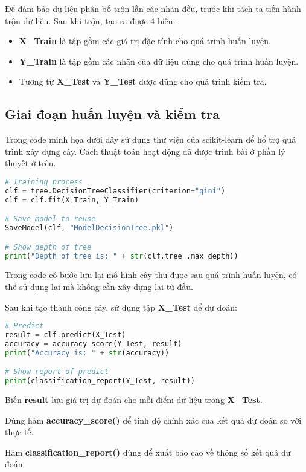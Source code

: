 \documentclass[../main-report.tex]{subfiles}
\begin{document}
Để đảm bảo dữ liệu phân bố trộn lẫn các nhãn đều, trước khi tách ta tiến hành trộn dữ liệu. Sau khi trộn, tạo ra được 4 biến:

\begin{itemize}
\item \textbf{X\_Train} là tập gồm các giá trị đặc tính cho quá trình huấn luyện.
\item \textbf{Y\_Train} là tập gồm các nhãn cũa dữ liệu dùng cho quá trình huấn luyện.
\item Tương tự \textbf{X\_Test} và \textbf{Y\_Test} được dùng cho quá trình kiểm tra.
\end{itemize}

\subsection{Giai đoạn huấn luyện và kiểm tra}
Trong code minh họa dưới đây sử dụng thư viện của scikit-learn để hổ trợ quá trình xây dựng cây. Cách thuật toán hoạt động đã được trình bài ở phần lý thuyết ở trên.

\begin{lstlisting}[language=Python]
# Training process
clf = tree.DecisionTreeClassifier(criterion="gini")
clf = clf.fit(X_Train, Y_Train)

# Save model to reuse
SaveModel(clf, "ModelDecisionTree.pkl")

# Show depth of tree
print("Depth of tree is: " + str(clf.tree_.max_depth))
\end{lstlisting}

Trong code có bước lưu lại mô hình cây thu được sau quá trình huấn luyện, có thể sử dụng lại mà không cần xây dựng lại từ đầu.

Sau khi tạo thành công cây, sử dụng tập \textbf{X\_Test} để dự đoán:

\begin{lstlisting}[language=Python]
# Predict
result = clf.predict(X_Test)
accuracy = accuracy_score(Y_Test, result)
print("Accuracy is: " + str(accuracy))

# Show report of predict
print(classification_report(Y_Test, result))
\end{lstlisting}

Biến \textbf{result} lưu giá trị dự đoán cho mỗi điểm dữ liệu trong \textbf{X\_Test}.

Dùng hàm \textbf{accuracy\_score()} để tính độ chính xác của kết quả dự đoán so với thực tế.

Hàm \textbf{classification\_report()} dùng để xuất báo cáo về thông số kết quả dự đoán. 
\end{document}
